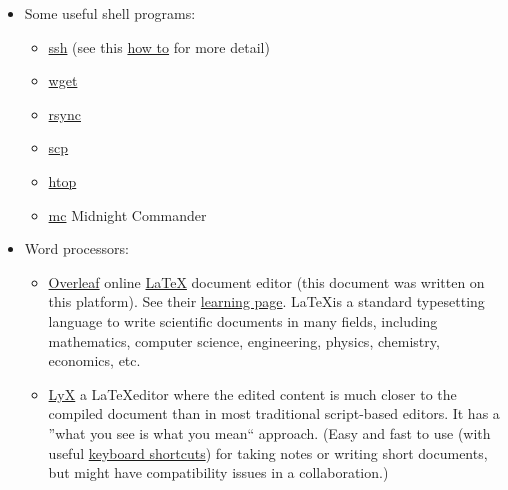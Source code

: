 \documentclass{article}
\begin{document}
\begin{itemize}
    \item Some useful shell programs:
    \begin{itemize}
        \item \href{https://linux.die.net/man/1/ssh}{ssh} (see this  \href{https://www.howtogeek.com/311287/how-to-connect-to-an-ssh-server-from-windows-macos-or-linux/}{how to} for more detail)
        \item \href{https://www.gnu.org/software/wget/manual/wget.html}{wget}
        \item \href{https://linux.die.net/man/1/rsync}{rsync}
        \item \href{https://linux.die.net/man/1/scp}{scp}
        \item \href{https://linux.die.net/man/1/htop}{htop}
        \item \href{https://linux.die.net/man/1/mc}{mc} Midnight Commander
    \end{itemize}
    
    \item Word processors:
        \begin{itemize}
            \item \href{https://www.overleaf.com/}{Overleaf} online \href{https://en.wikipedia.org/wiki/LaTeX}{\LaTeX} document editor (this document was written on this platform). See their \href{https://www.overleaf.com/learn}{learning page}. \LaTeX is a standard typesetting language to write scientific documents in many fields, including mathematics, computer science, engineering, physics, chemistry, economics, etc.
            
            \item \href{https://www.lyx.org/}{LyX} a \LaTeX editor where the edited content is much closer to the compiled document than in most traditional script-based editors. It has a ''what you see is what you mean`` approach. (Easy and fast to use (with useful \href{https://wiki.lyx.org/Tips/FrequentlyUsedShortcuts}{keyboard shortcuts}) for taking notes or writing short documents, but might have compatibility issues in a collaboration.)
            

\end{itemize}
\end{itemize}
\end{document}
